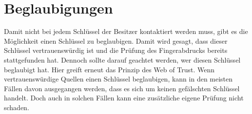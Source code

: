 \documentclass[12pt,a4paper]{scrreprt}
\begin{document}
\section{Beglaubigungen}
Damit nicht bei jedem Schlüssel der Besitzer kontaktiert werden muss, gibt es die Möglichkeit einen Schlüssel zu beglaubigen. Damit wird gesagt, dass dieser Schlüssel vertrauenswürdig ist und die Prüfung des Fingerabdrucks bereits stattgefunden hat. Dennoch sollte darauf geachtet werden, wer diesen Schlüssel beglaubigt hat. Hier greift erneut das Prinzip des Web of Trust. Wenn vertrauenswürdige Quellen einen Schlüssel beglaubigen, kann in den meisten Fällen davon ausgegangen werden, dass es sich um keinen gefälschten Schlüssel handelt. Doch auch in solchen Fällen kann eine zusätzliche eigene Prüfung nicht schaden.
\end{document}
